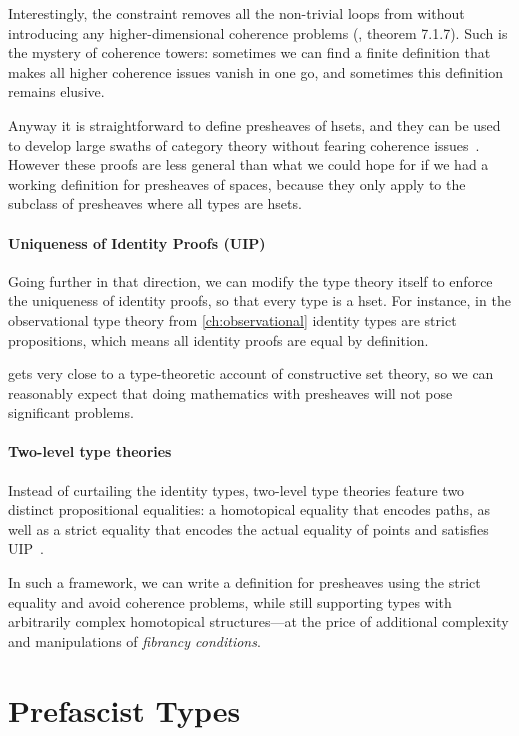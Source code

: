 Interestingly, the  constraint removes all the non-trivial 
loops from  without introducing any higher-dimensional coherence 
problems (, theorem 7.1.7). 
% 
Such is the mystery of coherence towers: sometimes we can find a finite 
definition that makes all higher coherence issues vanish in one go, and 
sometimes this definition remains elusive.

Anyway it is straightforward to define presheaves of hsets, and they can be used 
to develop large swaths of category theory without fearing coherence 
issues~. 
However these proofs are less general than what we could hope for if we had a 
working definition for presheaves of spaces, because they only apply to
the subclass of presheaves where all types are hsets.

\paragraph{Uniqueness of Identity Proofs (UIP)}
% 
Going further in that direction, we can modify the type theory itself to 
enforce the uniqueness of identity proofs, so that every type is a hset.
% 
For instance, in the observational type theory \SetoidCC from 
\cref{ch:observational} identity types are strict propositions,
which means all identity proofs are equal by definition.

\SetoidCC gets very close to a type-theoretic account of constructive set 
theory, so we can reasonably expect that doing mathematics with presheaves 
will not pose significant problems.

\paragraph{Two-level type theories}
% 
Instead of curtailing the identity types, two-level type theories 
feature two distinct propositional equalities: a homotopical equality that 
encodes paths, as well as a strict equality that encodes the actual equality
of points and satisfies UIP~.

In such a framework, we can write a definition for presheaves using the strict equality
and avoid coherence problems, while still supporting types with arbitrarily
complex homotopical structures---at the price of additional complexity
and manipulations of \emph{fibrancy conditions}.

\section{Prefascist Types}
\label{sec:prefascist}

